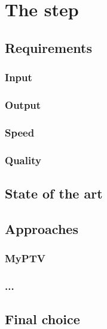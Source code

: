 \chapter{The \match* step}
\label{chap:matching}

\section{Requirements}

\subsection{Input}

\subsection{Output}

\subsection{Speed}

\subsection{Quality}

\section{State of the art}

\section{Approaches}

\subsection{MyPTV}

\subsection{...}

\section{Final choice}

